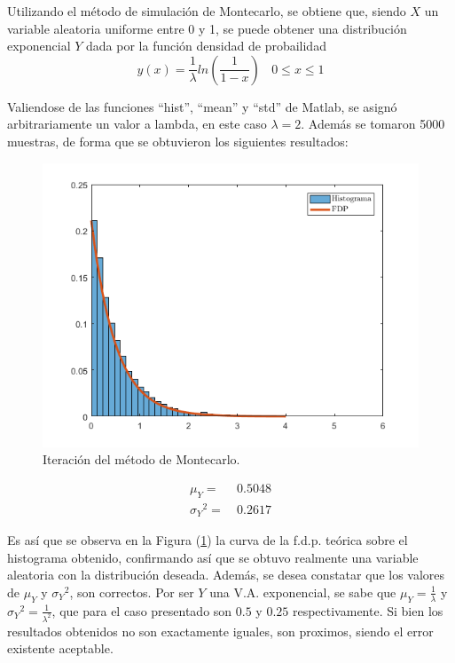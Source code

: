 Utilizando el método de simulación de Montecarlo, se obtiene que, siendo $X$ un variable aleatoria uniforme entre 0 y 1, se puede obtener una distribución exponencial $Y$ dada por la función densidad de probailidad
\begin{equation}
	y(x) = \frac{1}{\lambda} ln\left( \frac{1}{1 - x} \right) \ \ \ \ 0 \leq x \leq 1
\end{equation}

Valiendose de las funciones ``hist'', ``mean'' y ``std'' de Matlab, se asignó arbitrariamente un valor a lambda, en este caso $\lambda = 2$. Además se tomaron 5000 muestras, de forma que se obtuvieron los siguientes resultados:
\begin{figure}[H]
	\centering
	\includegraphics[width=0.7\linewidth]{./ImagenesEjercicio1/Simu-1.png}
	\caption{Iteración del método de Montecarlo.}
	\label{fig:primerit}
\end{figure}

\begin{equation}
\begin{aligned}
		\mu_{Y} = & \ 0.5048 \\
		{\sigma_{Y}}^{2} = & \ 0.2617
\end{aligned}
\end{equation}

Es así que se observa en la Figura (\ref{fig:primerit}) la curva de la f.d.p. teórica sobre el histograma obtenido, confirmando así que se obtuvo realmente una variable aleatoria con la distribución deseada. Además, se desea constatar que los valores de $\mu_{Y}$ y ${\sigma_{Y}}^{2}$, son correctos. Por ser $Y$ una V.A. exponencial, se sabe que $\mu_{Y} = \frac{1}{\lambda}$ y ${\sigma_{Y}}^{2} = \frac{1}{\lambda^2}$, que para el caso presentado son $0.5$ y $0.25$ respectivamente. Si bien los resultados obtenidos no son exactamente iguales, son proximos, siendo el error existente aceptable.  

